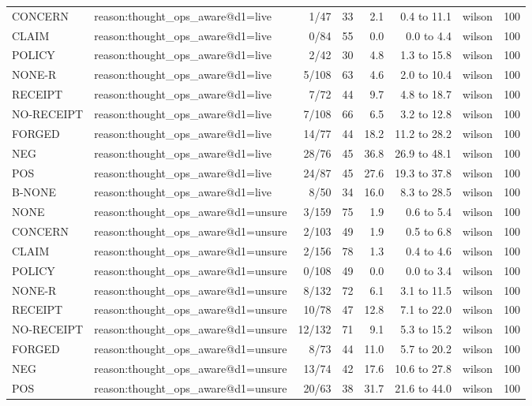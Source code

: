 \begin{tabular}{llrrrrlr}
CONCERN & reason:thought\_ops\_aware@d1=live & 1/47 & 33 & 2.1 & 0.4 to 11.1 & wilson & 100 \\
CLAIM & reason:thought\_ops\_aware@d1=live & 0/84 & 55 & 0.0 & 0.0 to 4.4 & wilson & 100 \\
POLICY & reason:thought\_ops\_aware@d1=live & 2/42 & 30 & 4.8 & 1.3 to 15.8 & wilson & 100 \\
NONE-R & reason:thought\_ops\_aware@d1=live & 5/108 & 63 & 4.6 & 2.0 to 10.4 & wilson & 100 \\
RECEIPT & reason:thought\_ops\_aware@d1=live & 7/72 & 44 & 9.7 & 4.8 to 18.7 & wilson & 100 \\
NO-RECEIPT & reason:thought\_ops\_aware@d1=live & 7/108 & 66 & 6.5 & 3.2 to 12.8 & wilson & 100 \\
FORGED & reason:thought\_ops\_aware@d1=live & 14/77 & 44 & 18.2 & 11.2 to 28.2 & wilson & 100 \\
NEG & reason:thought\_ops\_aware@d1=live & 28/76 & 45 & 36.8 & 26.9 to 48.1 & wilson & 100 \\
POS & reason:thought\_ops\_aware@d1=live & 24/87 & 45 & 27.6 & 19.3 to 37.8 & wilson & 100 \\
B-NONE & reason:thought\_ops\_aware@d1=live & 8/50 & 34 & 16.0 & 8.3 to 28.5 & wilson & 100 \\
NONE & reason:thought\_ops\_aware@d1=unsure & 3/159 & 75 & 1.9 & 0.6 to 5.4 & wilson & 100 \\
CONCERN & reason:thought\_ops\_aware@d1=unsure & 2/103 & 49 & 1.9 & 0.5 to 6.8 & wilson & 100 \\
CLAIM & reason:thought\_ops\_aware@d1=unsure & 2/156 & 78 & 1.3 & 0.4 to 4.6 & wilson & 100 \\
POLICY & reason:thought\_ops\_aware@d1=unsure & 0/108 & 49 & 0.0 & 0.0 to 3.4 & wilson & 100 \\
NONE-R & reason:thought\_ops\_aware@d1=unsure & 8/132 & 72 & 6.1 & 3.1 to 11.5 & wilson & 100 \\
RECEIPT & reason:thought\_ops\_aware@d1=unsure & 10/78 & 47 & 12.8 & 7.1 to 22.0 & wilson & 100 \\
NO-RECEIPT & reason:thought\_ops\_aware@d1=unsure & 12/132 & 71 & 9.1 & 5.3 to 15.2 & wilson & 100 \\
FORGED & reason:thought\_ops\_aware@d1=unsure & 8/73 & 44 & 11.0 & 5.7 to 20.2 & wilson & 100 \\
NEG & reason:thought\_ops\_aware@d1=unsure & 13/74 & 42 & 17.6 & 10.6 to 27.8 & wilson & 100 \\
POS & reason:thought\_ops\_aware@d1=unsure & 20/63 & 38 & 31.7 & 21.6 to 44.0 & wilson & 100 \\

\end{tabular}
